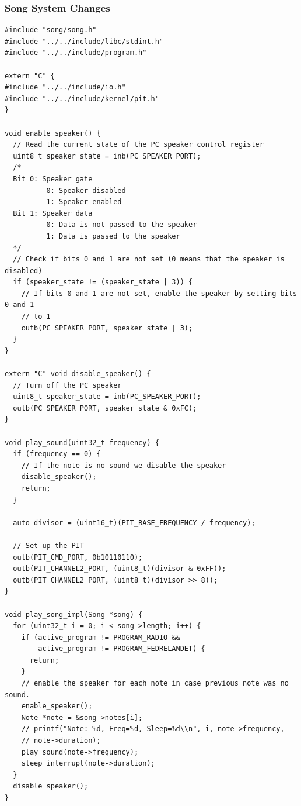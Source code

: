 \documentclass[../main.tex]{subfiles}
\begin{document}
\subsubsection{Song System Changes}
\label{apx:song_system_changes}


\begin{listing}[H]
    \begin{verbatim}
#include "song/song.h"
#include "../../include/libc/stdint.h"
#include "../../include/program.h"

extern "C" {
#include "../../include/io.h"
#include "../../include/kernel/pit.h"
}

void enable_speaker() {
  // Read the current state of the PC speaker control register
  uint8_t speaker_state = inb(PC_SPEAKER_PORT);
  /*
  Bit 0: Speaker gate
          0: Speaker disabled
          1: Speaker enabled
  Bit 1: Speaker data
          0: Data is not passed to the speaker
          1: Data is passed to the speaker
  */
  // Check if bits 0 and 1 are not set (0 means that the speaker is disabled)
  if (speaker_state != (speaker_state | 3)) {
    // If bits 0 and 1 are not set, enable the speaker by setting bits 0 and 1
    // to 1
    outb(PC_SPEAKER_PORT, speaker_state | 3);
  }
}

extern "C" void disable_speaker() {
  // Turn off the PC speaker
  uint8_t speaker_state = inb(PC_SPEAKER_PORT);
  outb(PC_SPEAKER_PORT, speaker_state & 0xFC);
}

void play_sound(uint32_t frequency) {
  if (frequency == 0) {
    // If the note is no sound we disable the speaker
    disable_speaker();
    return;
  }

  auto divisor = (uint16_t)(PIT_BASE_FREQUENCY / frequency);

  // Set up the PIT
  outb(PIT_CMD_PORT, 0b10110110);
  outb(PIT_CHANNEL2_PORT, (uint8_t)(divisor & 0xFF));
  outb(PIT_CHANNEL2_PORT, (uint8_t)(divisor >> 8));
}

void play_song_impl(Song *song) {
  for (uint32_t i = 0; i < song->length; i++) {
    if (active_program != PROGRAM_RADIO &&
        active_program != PROGRAM_FEDRELANDET) {
      return;
    }
    // enable the speaker for each note in case previous note was no sound.
    enable_speaker();
    Note *note = &song->notes[i];
    // printf("Note: %d, Freq=%d, Sleep=%d\\n", i, note->frequency,
    // note->duration);
    play_sound(note->frequency);
    sleep_interrupt(note->duration);
  }
  disable_speaker();
}


\end{verbatim}
\end{listing}
\end{document}
